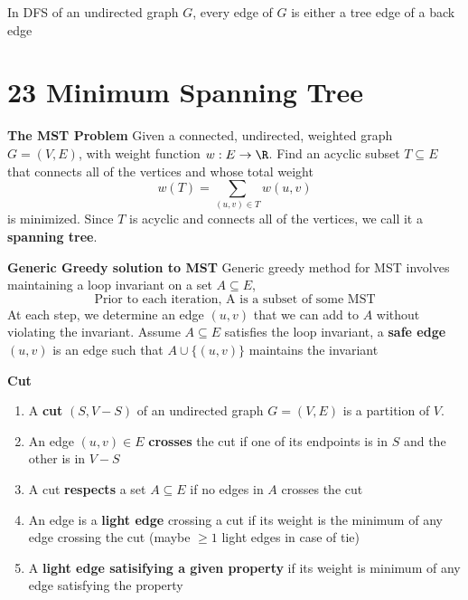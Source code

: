 \documentclass[11pt]{article}
\begin{document}
\begin{theorem*}
    In DFS of an undirected graph $G$, every edge of $G$ is either a tree edge of a back edge 
\end{theorem*}


\section*{23 Minimum Spanning Tree}

\begin{defn*}
    \textbf{The MST Problem} Given a connected, undirected, weighted graph $G = (V,E)$, with weight function $w: E\to \R$. Find an acyclic subset $T\subseteq E$ that connects all of the vertices and whose total weight 
    \[
        w(T) = \sum_{(u,v)\in T} w(u,v)
    \]
    is minimized. Since $T$ is acyclic and connects all of the vertices, we call it a \textbf{spanning tree}. 
\end{defn*}
$ $\\
\textbf{Generic Greedy solution to MST}
Generic greedy method for MST involves maintaining a loop invariant on a set $A \subseteq E$, 
\[
    \text{Prior to each iteration, A is a subset of some MST}
\]
At each step, we determine an edge $(u,v)$ that we can add to $A$ without violating the invariant. Assume $A \subseteq E$ satisfies the loop invariant, a \textbf{safe edge} $(u,v)$ is an edge such that $A\cup \{(u,v) \}$ maintains the invariant


\begin{defn*}
    \textbf{Cut} 
    \begin{enumerate}
        \item A \textbf{cut} $(S, V-S)$ of an undirected graph $G = (V,E)$ is a partition of $V$. 
        \item An edge $(u,v) \in E$ \textbf{crosses} the cut if one of its endpoints is in $S$ and the other is in $V - S$
        \item A cut \textbf{respects} a set $A \subseteq E$ if no edges in $A$ crosses the cut 
        \item An edge is a \textbf{light edge} crossing a cut if its weight is the minimum of any edge crossing the cut (maybe $\geq 1$ light edges in case of tie)
        \item A \textbf{light edge satisifying a given property} if its weight is minimum of any edge satisfying the property 
    \end{enumerate}
\end{defn*}
\end{document}
